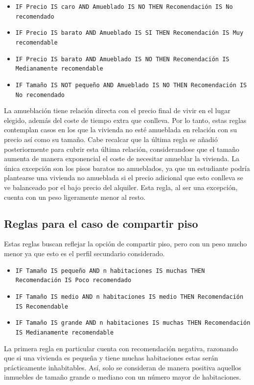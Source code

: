 \documentclass[12pt]{report} %
\begin{document}
    \begin{itemize}
        \item \texttt{IF Precio IS caro AND Amueblado IS NO THEN Recomendación IS No recomendado}
        \item \texttt{IF Precio IS barato AND Amueblado IS SI THEN Recomendación IS Muy recomendable}
        \item \texttt{IF Precio IS barato AND Amueblado IS NO THEN Recomendación IS Medianamente recomendable}
        \item \texttt{IF Tamaño IS NOT pequeño AND Amueblado IS NO THEN Recomendación IS No recomendado}
    \end{itemize}

    La amueblación tiene relación directa con el precio final de vivir en el lugar elegido, 
    además del coste de tiempo extra que conlleva. Por lo tanto, estas reglas contemplan casos en 
    los que la vivienda no esté amueblada en relación con su precio así como su tamaño. Cabe recalcar
    que la última regla se añadió posteriormente para cubrir esta última relación, considerandose que el 
    tamaño aumenta de manera exponencial el coste de necesitar amueblar la vivienda. La única excepción
    son los pisos baratos no amueblados, ya que un estudiante podría plantearse una vivienda no amueblada 
    si el precio adicional que esto conlleva se ve balanceado por el bajo precio del alquiler. Esta regla, 
    al ser una excepción, cuenta con un peso ligeramente menor al resto. 

    \subsection{Reglas para el caso de compartir piso}
    Estas reglas buscan reflejar la opción de compartir piso, pero con un peso mucho menor ya que esto 
    es el perfil secundario considerado. 

    \begin{itemize}
        \item \texttt{IF Tamaño IS pequeño AND n habitaciones IS muchas THEN Recomendación IS Poco recomendado}
        \item \texttt{IF Tamaño IS medio AND n habitaciones IS medio THEN Recomendación IS Recomendable}
        \item \texttt{IF Tamaño IS grande AND n habitaciones IS muchas THEN Recomendación IS Medianamente recomendable}
    \end{itemize}

    La primera regla en particular cuenta con recomendación negativa, razonando que si una vivienda es pequeña 
    y tiene muchas habitaciones estas serán prácticamente inhabitables. Así, solo se consideran de manera 
    positiva aquellos inmuebles de tamaño grande o mediano con un número mayor de habitaciones.
\end{document}
